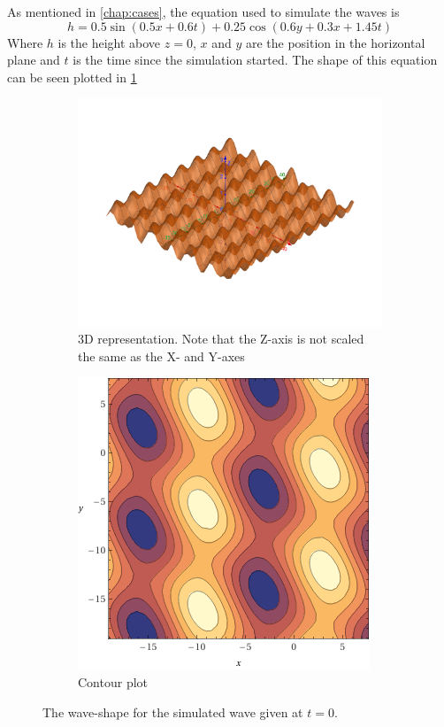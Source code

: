 \documentclass[class=article, crop=false]{standalone}
\begin{document}
As mentioned in \cref{chap:cases}, the equation used to simulate the waves is
\[h = 0.5\sin(0.5 x +0.6t) + 0.25\cos(0.6y + 0.3x + 1.45t)\]
Where \(h\) is the height above \(z=0\), \(x\) and \(y\) are the position in the horizontal plane and \(t\) is the time since the simulation started. The shape of this equation can be seen plotted in \cref{fig:wave-shape}

\begin{figure}
    \centering
    \begin{subfigure}{0.45\textwidth}
        \centering
        \includegraphics{wave-shape}
        \caption{3D representation. Note that the Z-axis is not scaled the same as the X- and Y-axes}
    \end{subfigure}
    \hfill
    \begin{subfigure}{0.45\textwidth}
        \centering
        \includegraphics{wave-contour}
        \caption{Contour plot}
    \end{subfigure}
    \caption{The wave-shape for the simulated wave given at \(t=0\).}
    \label{fig:wave-shape}
\end{figure}
\end{document}
